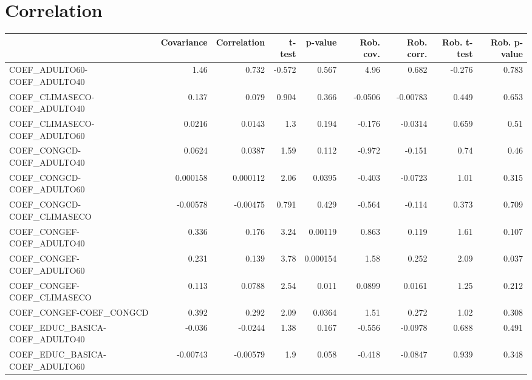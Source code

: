 \section{Correlation}
\begin{tabular}{lrrrrrrrr}
\toprule
{} &  Covariance &  Correlation &   t-test &  p-value &  Rob. cov. &  Rob. corr. &  Rob. t-test &  Rob. p-value \\
\midrule
COEF\_ADULTO60-COEF\_ADULTO40           &        1.46 &        0.732 &   -0.572 &    0.567 &       4.96 &       0.682 &       -0.276 &         0.783 \\
COEF\_CLIMASECO-COEF\_ADULTO40          &       0.137 &        0.079 &    0.904 &    0.366 &    -0.0506 &    -0.00783 &        0.449 &         0.653 \\
COEF\_CLIMASECO-COEF\_ADULTO60          &      0.0216 &       0.0143 &      1.3 &    0.194 &     -0.176 &     -0.0314 &        0.659 &          0.51 \\
COEF\_CONGCD-COEF\_ADULTO40             &      0.0624 &       0.0387 &     1.59 &    0.112 &     -0.972 &      -0.151 &         0.74 &          0.46 \\
COEF\_CONGCD-COEF\_ADULTO60             &    0.000158 &     0.000112 &     2.06 &   0.0395 &     -0.403 &     -0.0723 &         1.01 &         0.315 \\
COEF\_CONGCD-COEF\_CLIMASECO            &    -0.00578 &     -0.00475 &    0.791 &    0.429 &     -0.564 &      -0.114 &        0.373 &         0.709 \\
COEF\_CONGEF-COEF\_ADULTO40             &       0.336 &        0.176 &     3.24 &  0.00119 &      0.863 &       0.119 &         1.61 &         0.107 \\
COEF\_CONGEF-COEF\_ADULTO60             &       0.231 &        0.139 &     3.78 & 0.000154 &       1.58 &       0.252 &         2.09 &         0.037 \\
COEF\_CONGEF-COEF\_CLIMASECO            &       0.113 &       0.0788 &     2.54 &    0.011 &     0.0899 &      0.0161 &         1.25 &         0.212 \\
COEF\_CONGEF-COEF\_CONGCD               &       0.392 &        0.292 &     2.09 &   0.0364 &       1.51 &       0.272 &         1.02 &         0.308 \\
COEF\_EDUC\_BASICA-COEF\_ADULTO40        &      -0.036 &      -0.0244 &     1.38 &    0.167 &     -0.556 &     -0.0978 &        0.688 &         0.491 \\
COEF\_EDUC\_BASICA-COEF\_ADULTO60        &    -0.00743 &     -0.00579 &      1.9 &    0.058 &     -0.418 &     -0.0847 &        0.939 &         0.348 \\

\end{tabular}
